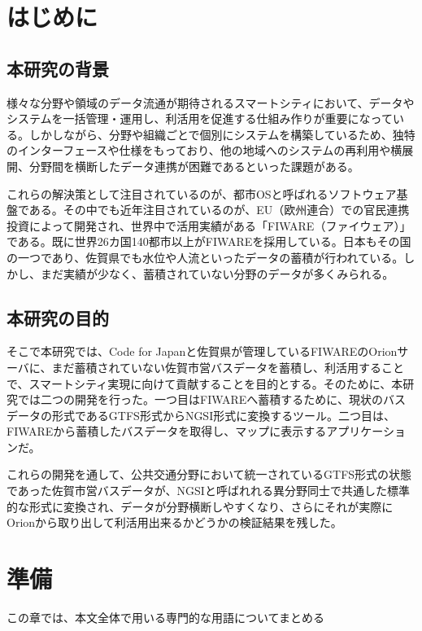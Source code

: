 \documentclass[a4paper, 12pt]{jsreport}
\begin{document}
  \tableofcontents

  \chapter{はじめに}
  \section{本研究の背景}
  \par 様々な分野や領域のデータ流通が期待されるスマートシティにおいて、データやシステムを一括管理・運用し、利活用を促進する仕組み作りが重要になっている。しかしながら、分野や組織ごとで個別にシステムを構築しているため、独特のインターフェースや仕様をもっており、他の地域へのシステムの再利用や横展開、分野間を横断したデータ連携が困難であるといった課題がある。
  \par これらの解決策として注目されているのが、都市OSと呼ばれるソフトウェア基盤である。その中でも近年注目されているのが、EU（欧州連合）での官民連携投資によって開発され、世界中で活用実績がある「FIWARE（ファイウェア）」である。既に世界26カ国140都市以上がFIWAREを採用している。日本もその国の一つであり、佐賀県でも水位や人流といったデータの蓄積が行われている。しかし、まだ実績が少なく、蓄積されていない分野のデータが多くみられる。
  \section{本研究の目的}
  \par そこで本研究では、Code for Japanと佐賀県が管理しているFIWAREのOrionサーバに、まだ蓄積されていない佐賀市営バスデータ\cite{sagaBusSite}を蓄積し、利活用することで、スマートシティ実現に向けて貢献することを目的とする。そのために、本研究では二つの開発を行った。一つ目はFIWAREへ蓄積するために、現状のバスデータの形式であるGTFS形式からNGSI形式に変換するツール。二つ目は、FIWAREから蓄積したバスデータを取得し、マップに表示するアプリケーションだ。
  \par これらの開発を通して、公共交通分野において統一されているGTFS形式の状態であった佐賀市営バスデータが、NGSIと呼ばれれる異分野同士で共通した標準的な形式に変換され、データが分野横断しやすくなり、さらにそれが実際にOrionから取り出して利活用出来るかどうかの検証結果を残した。

  \chapter{準備}
  この章では、本文全体で用いる専門的な用語についてまとめる
\end{document}
